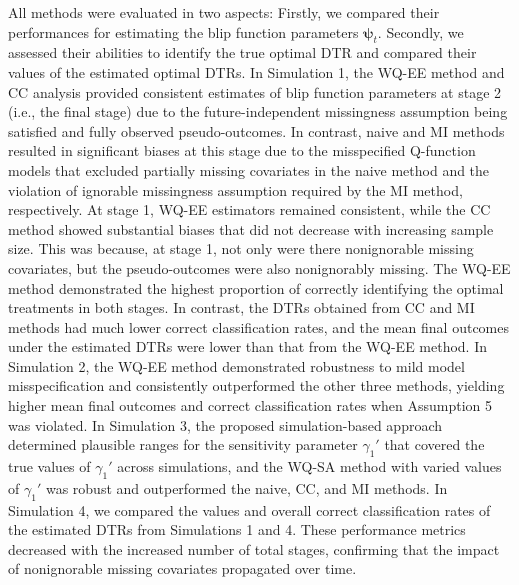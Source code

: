 \documentclass[12pt]{article}
\begin{document}
All methods were evaluated in two aspects: Firstly, we compared their performances for estimating the blip function parameters $\bm{\psi}_t$. Secondly, we assessed their abilities to identify the true optimal DTR and compared their values of the estimated optimal DTRs. In Simulation 1, the WQ-EE method and CC analysis provided consistent estimates of blip function parameters at stage 2 (i.e., the final stage) due to the future-independent missingness assumption being satisfied and fully observed pseudo-outcomes. In contrast, naive and MI methods resulted in significant biases at this stage due to the misspecified Q-function models that excluded partially missing covariates in the naive method and the violation of ignorable missingness assumption required by the MI method, respectively.
At stage 1, WQ-EE estimators remained consistent, while the CC method showed substantial biases that did not decrease with increasing sample size. This was because, at stage 1, not only were there nonignorable missing covariates, but the pseudo-outcomes were also nonignorably missing.
The WQ-EE method demonstrated the highest proportion of correctly identifying the optimal treatments in both stages. In contrast, the DTRs obtained from CC and MI methods had much lower correct classification rates, and the mean final outcomes under the estimated DTRs were lower than that from the WQ-EE method. In Simulation 2, the WQ-EE method demonstrated robustness to mild model misspecification and consistently outperformed the other three methods, yielding higher mean final outcomes and correct classification rates when Assumption 5 was violated. %
In Simulation 3, the proposed simulation-based approach determined plausible ranges for the sensitivity parameter $\gamma_1'$ that covered the true values of $\gamma_1'$ across simulations, and the WQ-SA method with varied values of $\gamma_1'$ was robust and outperformed the naive, CC, and MI methods. In Simulation 4, %
 we compared the values and  overall correct classification rates of the estimated DTRs from Simulations 1 and 4. These performance metrics decreased with the increased number of  total stages,  confirming that the impact of nonignorable missing covariates  propagated over time.%
 
\end{document}
